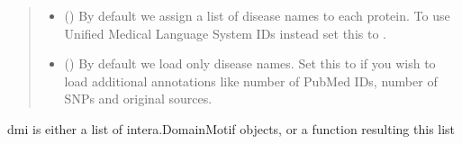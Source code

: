 \documentclass[letterpaper,10pt,english]{sphinxmanual}
\begin{document}
\begin{fulllineitems}
\begin{fulllineitems}
\begin{quote}
\begin{description}
\begin{itemize}
\item {} 
 () \textendash{} By default we assign a list of disease names to
each protein. To use Unified Medical Language System IDs instead
set this to .

\item {} 
 () \textendash{} By default we load only disease names. Set this
to  if you wish to load additional annotations like number
of PubMed IDs, number of SNPs and original sources.

\end{itemize}

\end{description}\end{quote}

\end{fulllineitems}


\begin{fulllineitems}
\label{\detokenize{main:pypath.main.PyPath.load_dmi}}
dmi is either a list of intera.DomainMotif objects,
or a function resulting this list

\end{fulllineitems}


\begin{fulllineitems}
\label{\detokenize{main:pypath.main.PyPath.load_dmis}}
\end{fulllineitems}


\begin{fulllineitems}
\label{\detokenize{main:pypath.main.PyPath.load_domino_dmi}}
\end{fulllineitems}


\end{fulllineitems}
\end{document}

